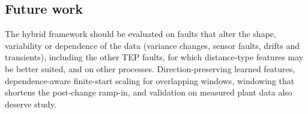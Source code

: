 \subsection{Future work}

The hybrid framework should be evaluated on faults that alter the shape, variability or dependence of the data
(variance changes, sensor faults, drifts and transients), including the other TEP faults, for which distance-type features may be better suited, and on other processes. Direction-preserving learned features, dependence-aware finite-start scaling for
overlapping windows, windowing that shortens the post-change ramp-in, and validation on measured
plant data also deserve study.
